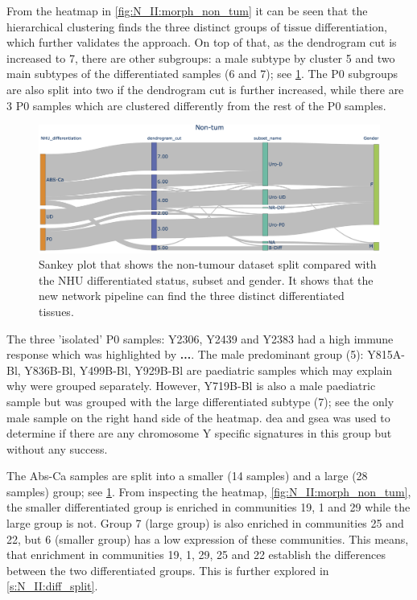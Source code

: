 From the heatmap in \cref{fig:N_II:morph_non_tum} it can be seen that the hierarchical clustering finds the three distinct groups of tissue differentiation, which further validates the approach. On top of that, as the dendrogram cut is increased to 7, there are other subgroups: a male subtype by cluster 5 and two main subtypes of the differentiated samples (6 and 7); see \cref{fig:N_II:sankey_comp}. The P0 subgroups are also split into two if the dendrogram cut is further increased, while there are 3 P0 samples which are clustered differently from the rest of the P0 samples. 

\begin{figure}[!t]    
    \centering
    \includegraphics[width=1.0\textwidth,height=1.0\textheight,keepaspectratio]{Sections/Network_II/resources/non_tum/non_tum_split.png}
    \caption{Sankey plot that shows the non-tumour dataset split compared with the NHU differentiated status, subset and gender. It shows that the new network pipeline can find the three distinct differentiated tissues.}
    \label{fig:N_II:sankey_comp}
\end{figure}

The three 'isolated' P0 samples: Y2306, Y2439 and Y2383 had a high immune response which was highlighted by \textbf{...}. The male predominant group (5): Y815A-Bl, Y836B-Bl, Y499B-Bl, Y929B-Bl are paediatric samples which may explain why were grouped separately. However, Y719B-Bl is also a male paediatric sample but was grouped with the large differentiated subtype (7); see the only male sample on the right hand side of the heatmap. \acrfull{dea} and \acrfull{gsea} was used to determine if there are any chromosome Y specific signatures in this group but without any success.

The Abs-Ca samples are split into a smaller (14 samples) and a large (28 samples) group; see \cref{fig:N_II:sankey_comp}. From inspecting the heatmap, \cref{fig:N_II:morph_non_tum}, the smaller differentiated group is enriched in communities 19, 1 and 29 while the large group is not. Group 7 (large group) is also enriched in communities 25 and 22,  but 6 (smaller group) has a low expression of these communities. This means, that enrichment in communities 19, 1, 29, 25 and 22 establish the differences between the two differentiated groups. This is further explored in \cref{s:N_II:diff_split}.


